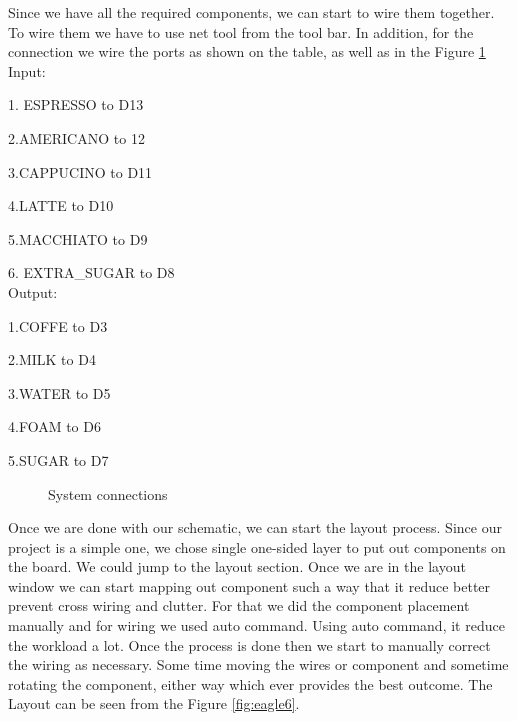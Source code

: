 \documentclass[12pt]{article}
\begin{document}
Since we have all the required components, we can start to wire them together. To wire them we have to use net tool from the tool bar. In addition, for the connection we wire the ports as shown on the table, as well as in the Figure \ref{fig:eagle5} \\



Input:			

1. ESPRESSO          to D13 

2.AMERICANO       to 12		

3.CAPPUCINO        to D11		

4.LATTE                   to D10		

5.MACCHIATO        to D9			

6. EXTRA\_SUGAR   to D8  \\

 
Output:

1.COFFE	to D3

			  2.MILK	to D4

			  3.WATER	to D5

			  4.FOAM	to D6

				  5.SUGAR	to D7


\begin{figure}[H]
\caption{System connections}
\label{fig:eagle5}
\end{figure}

Once we are done with our schematic, we can start the layout process. Since our project is a simple one, we chose single one-sided layer to put out components on the board.
We could jump to the layout section. Once we are in the layout window we can start mapping out component such a way that it reduce better prevent cross wiring and clutter. For that we did the component placement manually and for wiring we used auto command. Using auto command, it reduce the workload a lot. Once the process is done then we start to manually correct the wiring as necessary. Some time moving the wires or component and sometime rotating the component, either way which ever provides the best outcome. The Layout can be seen from the Figure \ref{fig:eagle6}.
\end{document}

